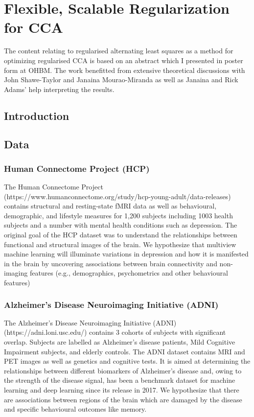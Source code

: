 \chapter{Flexible, Scalable Regularization for CCA}
\label{Regularised}
\minitoc
The content relating to regularised alternating least squares as a method for optimizing regularised CCA is based on an abstract which I presented in poster form at OHBM. The work benefitted from extensive theoretical discussions with John Shawe-Taylor and Janaina Mourao-Miranda as well as Janaina and Rick Adams' help interpreting the results.

\section{Introduction}

\section{Data}
\subsection{Human Connectome Project (HCP)}

The Human Connectome Project (https://www.humanconnectome.org/study/hcp-young-adult/data-releases) contains structural and resting-state fMRI data as well as behavioural, demographic, and lifestyle measures for 1,200 subjects including 1003 health subjects and a number with mental health conditions such as depression. The original goal of the HCP dataset was to understand the relationships between functional and structural images of the brain. We hypothesize that multiview machine learning will illuminate variations in depression and how it is manifested in the brain by uncovering associations between brain connectivity and non-imaging features (e.g., demographics, psychometrics and other behavioural features)

\subsection{Alzheimer's Disease Neuroimaging Initiative (ADNI)}

The Alzheimer's Disease Neuroimaging Initiative (ADNI) (https://adni.loni.usc.edu/) contains 3 cohorts of subjects with significant overlap. Subjects are labelled as Alzheimer's disease patients, Mild Cognitive Impairment subjects, and elderly controls. The ADNI dataset contains MRI and PET images as well as genetics and cognitive tests. It is aimed at determining the relationships between different biomarkers of Alzheimer's disease and, owing to the strength of the disease signal, has been a benchmark dataset for machine learning and deep learning since its release in 2017. We hypothesize that there are associations between regions of the brain which are damaged by the disease and specific behavioural outcomes like memory.


